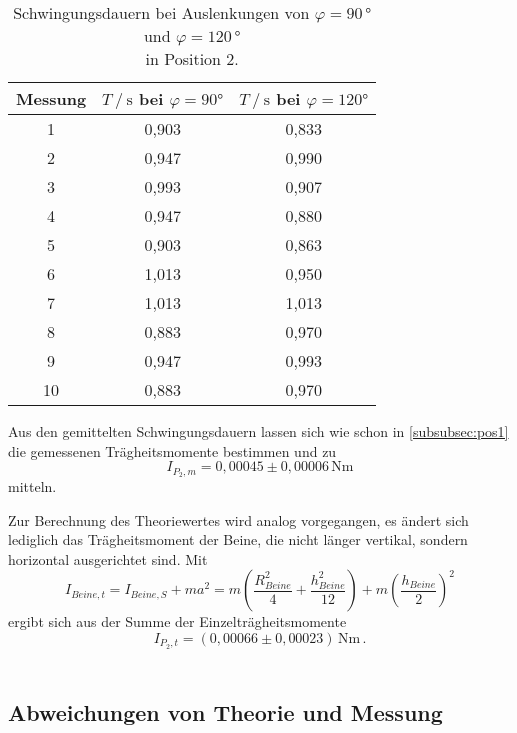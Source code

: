 \begin{table}[H]
  \centering
  \begin{tabular}{S[table-format=2.0] S[table-format=1.3] S}
      \toprule
      {Messung} & {$T \mathbin{/} \unit{\second}$ bei $\varphi = 90 \unit{\degree}$} & {$T \mathbin{/} \unit{\second}$ bei $\varphi = 120 \unit{\degree}$}\\
        & 0,903 & 0,833 \\
      2  & 0,947 & 0,990 \\
      3  & 0,993 & 0,907 \\
      4  & 0,947 & 0,880 \\
      5  & 0,903 & 0,863 \\
      6  & 1,013 & 0,950 \\
      7  & 1,013 & 1,013 \\
      8  & 0,883 & 0,970 \\
      9  & 0,947 & 0,993 \\
      10 & 0,883 & 0,970 \\
      \bottomrule
  \end{tabular}
  \caption{Schwingungsdauern bei Auslenkungen von $\varphi = 90 \, \unit{\degree}$ und $\varphi = 120 \, \unit{\degree}$ \\ in Position 2.}
  \label{tab:Messung_g}
\end{table}

Aus den gemittelten Schwingungsdauern lassen sich wie schon in \autoref{subsubsec:pos1} die gemessenen Trägheitsmomente bestimmen und zu
\begin{equation*}
  I_{P_2,m} = 0,00045 \pm 0,00006 \, \unit{\newton\meter}
\end{equation*}
mitteln.

Zur Berechnung des Theoriewertes wird analog vorgegangen, es ändert sich lediglich das Trägheitsmoment der Beine, die nicht länger vertikal, sondern horizontal ausgerichtet sind.
Mit 
\begin{equation*}
  I_{Beine,t} = I_{Beine,S} + m a^2 = m \left(\frac{R^2_{Beine}}{4} + \frac{h^2_{Beine}}{12} \right) + m \left(\frac{h_{Beine}}{2} \right)^2
\end{equation*}
ergibt sich aus der Summe der Einzelträgheitsmomente
\begin{equation*}
  I_{P_2,t} = (0,00066 \pm 0,00023) \, \unit{\newton\meter} \,.
\end{equation*} \\

\subsection{Abweichungen von Theorie und Messung}

